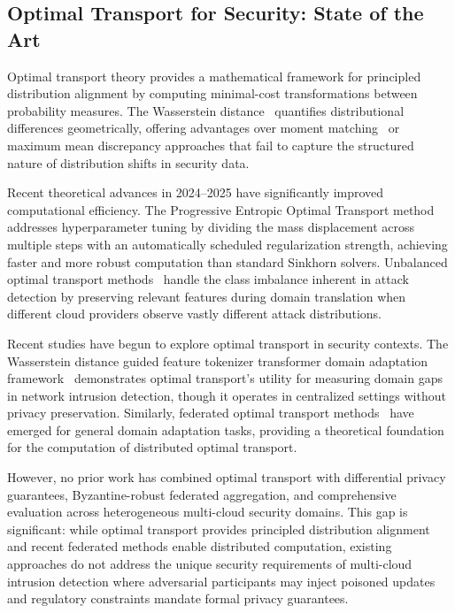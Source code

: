 \documentclass{ieeeaccess}
\theoremstyle{plain}
\theoremstyle{definition}
\theoremstyle{remark}
\begin{document}
\subsection{Optimal Transport for Security: State of the Art}

Optimal transport theory provides a mathematical framework for principled distribution alignment by computing minimal-cost transformations between probability measures. The Wasserstein distance~\cite{villani2008,peyre2019} quantifies distributional differences geometrically, offering advantages over moment matching~\cite{long2015} or maximum mean discrepancy approaches that fail to capture the structured nature of distribution shifts in security data.

Recent theoretical advances in 2024--2025 have significantly improved computational efficiency. The Progressive Entropic Optimal Transport method~\cite{kassraie2024} addresses hyperparameter tuning by dividing the mass displacement across multiple steps with an automatically scheduled regularization strength, achieving faster and more robust computation than standard Sinkhorn solvers. Unbalanced optimal transport methods~\cite{eyring2024,zhang2024} handle the class imbalance inherent in attack detection by preserving relevant features during domain translation when different cloud providers observe vastly different attack distributions.

Recent studies have begun to explore optimal transport in security contexts. The Wasserstein distance guided feature tokenizer transformer domain adaptation framework~\cite{rasheed2022} demonstrates optimal transport's utility for measuring domain gaps in network intrusion detection, though it operates in centralized settings without privacy preservation. Similarly, federated optimal transport methods~\cite{redko2020,alvarez2021} have emerged for general domain adaptation tasks, providing a theoretical foundation for the computation of distributed optimal transport.

However, no prior work has combined optimal transport with differential privacy guarantees, Byzantine-robust federated aggregation, and comprehensive evaluation across heterogeneous multi-cloud security domains. This gap is significant: while optimal transport provides principled distribution alignment and recent federated methods enable distributed computation, existing approaches do not address the unique security requirements of multi-cloud intrusion detection where adversarial participants may inject poisoned updates and regulatory constraints mandate formal privacy guarantees.
\end{document}
